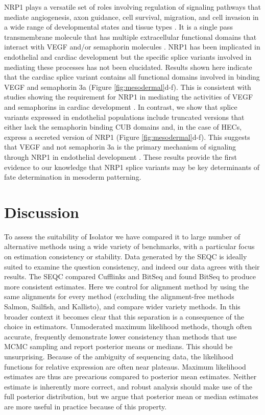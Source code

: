 \documentclass[twocolumn]{article}
\begin{document}
NRP1 plays a versatile set of roles involving regulation of signaling pathways
that mediate angiogenesis, axon guidance, cell survival, migration, and cell
invasion in a wide range of developmental states and tissue types
\cite{Zachary:2011dr}. It is a single pass transmembrane molecule that has
multiple extracellular functional domains that interact with VEGF and/or
semaphorin molecules \cite{Cackowski:2004ja}. NRP1 has been implicated in
endothelial \cite{Lee:2002dh} and cardiac \cite{Gu:2003vq} development but the
specific splice variants involved in mediating these processes has not been
elucidated.  Results shown here indicate that the cardiac splice variant
contains all functional domains involved in binding VEGF and semaphorin 3a
(Figure \ref{fig:mesodermal}d-f). This is consistent with studies showing the
requirement for NRP1 in mediating the activities of VEGF and semaphorins in
cardiac development \cite{Gu:2003vq}. In contrast, we show that splice variants
expressed in endothelial populations include truncated versions that either lack
the semaphorin binding CUB domains and, in the case of HECs, express a secreted
version of NRP1 (Figure \ref{fig:mesodermal}d-f). This suggests that VEGF and
not semaphorin 3a is the primary mechanism of signaling through NRP1 in
endothelial development \cite{Lee:2002dh}. These results provide the first
evidence to our knowledge that NRP1 splice variants may be key determinants of
fate determination in mesoderm patterning. 

\section{Discussion}\label{discussion}

To assess the suitability of Isolator we have compared it to large number of
alternative methods using a wide variety of benchmarks, with a particular focus
on estimation consistency or stability. Data generated by the SEQC is ideally
suited to examine the question consistency, and indeed our data agrees with
their results. The SEQC compared Cufflinks and BitSeq and found BitSeq to
produce more consistent estimates. Here we control for alignment method by using
the same alignments for every method (excluding the alignment-free methods
Salmon, Sailfish, and Kallisto), and compare wider variety methods. In this
broader context it becomes clear that this separation is a consequence of the
choice in estimators. Unmoderated maximum likelihood methods, though often
accurate, frequently demonstrate lower consistency than methods that use MCMC
sampling and report posterior means or medians. This should be unsurprising.
Because of the ambiguity of sequencing data, the likelihood functions for
relative expression are often near plateaus. Maximum likelihood estimates are
thus are precarious compared to posterior mean estimates. Neither estimate is
inherently more correct, and robust analysis should make use of the full
posterior distribution, but we argue that posterior mean or median estimates
are more useful in practice because of this property.
\end{document}
